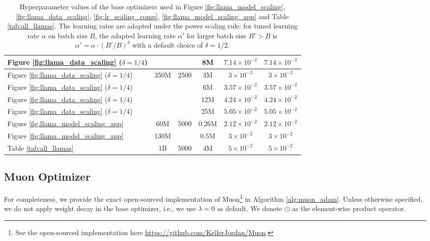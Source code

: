 \documentclass{article}
\theoremstyle{plain}
\theoremstyle{definition}
\theoremstyle{remark}
\begin{document}
\begin{table}[hbt!]
{\begin{tabular}{l|c c c c c}
    Figure \ref{fig:llama_data_scaling} ($\delta=1/4$) &  & & 8M & $7.14\times 10^{-2}$ & $7.14\times 10^{-2}$ \\
    \midrule
    Figure \ref{fig:llama_data_scaling} ($\delta=1/4$) & \multirow{4}{*}{350M} & \multirow{4}{*}{2500} & 3M & $3\times 10^{-2}$ & $3\times 10^{-2}$ \\
    Figure \ref{fig:llama_data_scaling} ($\delta=1/4$) &  & & 6M & $3.57\times 10^{-2}$ & $3.57\times 10^{-2}$ \\
    Figure \ref{fig:llama_data_scaling} ($\delta=1/4$) &  & & 12M & $4.24\times 10^{-2}$ & $4.24\times 10^{-2}$ \\
    Figure \ref{fig:llama_data_scaling} ($\delta=1/4$) &  & & 25M & $5.05\times 10^{-2}$ & $5.05\times 10^{-2}$ \\
    \midrule
    Figure \ref{fig:llama_model_scaling_app} & 60M & \multirow{2}{*}{5000} & 0.26M & $2.12\times 10^{-2}$ & $2.12\times 10^{-2}$ \\
    Figure \ref{fig:llama_model_scaling_app} & 130M &  & 0.5M & $3\times 10^{-2}$ & $3\times 10^{-2}$ \\
    \midrule
    Table \ref{tab:all_llamas} & 1B & 5000 & 4M & $5\times 10^{-2}$ & $5\times 10^{-2}$ \\
    \bottomrule
    \end{tabular}
    }
    \caption{Hyperparameter values of the base optimizers used in Figure \ref{fig:llama_model_scaling}, \ref{fig:llama_data_scaling}, \ref{fig:lr_scaling_comp}, \ref{fig:llama_model_scaling_app} and Table \ref{tab:all_llamas}. The learning rates are adapted under the power scaling rule: for tuned learning rate $\alpha$ on batch size $B$, the adapted learning rate $\alpha'$ for larger batch size $B' > B$ is $\alpha' = \alpha \cdot (B'/B)^{\delta}$ with a default choice of $\delta = 1/2$.}
    \label{tab:llama_hp}
\end{table}
\newpage
\subsection{Muon Optimizer}\label{app:muon}
For completeness, we provide the exact open-sourced implementation of Muon\footnote{See the open-sourced implementation here \url{https://github.com/KellerJordan/Muon}.} in Algorithm \ref{alg:muon_adam}. Unless otherwise specified, we do not apply weight decay in the base optimizer, i.e., we use $\lambda = 0$ as default. We denote $\odot$ as the element-wise product operator.
\end{document}
